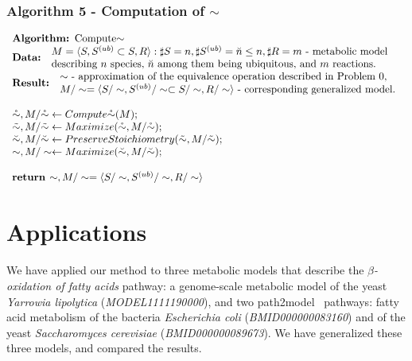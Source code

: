\documentclass[9pt]{article}
\begin{document}
\subsubsection*{Algorithm 5 - Computation of ${\sim}$}
\[ \begin{array}{l}
\mbox{\textbf{Algorithm: }Compute${\sim}$}\\
\mbox{\textbf{Data: }}\begin{array}{l}\mbox{$M=\langle{S, S^{(ub)}\subset{S}, R}\rangle: \sharp S = n, \sharp S^{(ub)}=\breve{n} \leq n, \sharp R = m$ - metabolic model}\\ \mbox{describing $n$ species,  $\breve{n}$ among them being ubiquitous,  and $m$ reactions.}\end{array}\\
\mbox{\textbf{Result: }}\begin{array}{l}\mbox{$\sim$ - approximation of the equivalence operation described in Problem~0,}\\ \mbox{$M/\sim = \langle S/\sim, S^{(ub)}/\sim \subset S/\sim, R/\sim \rangle$ - corresponding generalized model.}\end{array}\\
\mbox{~}\\
\mbox{$\mathring{\sim}, M/\mathring{\sim} \leftarrow Compute\mathring{\sim}(M);$} \\
\mbox{$\tilde{\sim}, M/\tilde{\sim} \leftarrow Maximize(\mathring{\sim}, M/{\mathring{\sim}});$} \\
\mbox{$\breve{\sim}, M/\breve{\sim} \leftarrow PreserveStoichiometry(\tilde{\sim}, M/\tilde{\sim});$} \\
\mbox{$\sim, M/\sim \leftarrow Maximize(\breve{\sim}, M/\breve{\sim});$} \\
\mbox{~}\\
\mbox{\textbf{return }$\sim, M/\sim = \langle S/\sim, S^{(ub)}/\sim, R/\sim \rangle$}
\end{array} \]

\newpage
\section*{Applications}
We have applied our method to three metabolic models that describe the \textit{$\beta$-oxidation of fatty acids} pathway: a genome-scale metabolic model of the yeast \textit{Yarrowia lipolytica} (\emph{MODEL1111190000}), and two path2model~\citep{Li10} pathways: fatty acid metabolism of the bacteria \textit{Escherichia coli} (\emph{BMID000000083160}) and of the yeast \textit{Saccharomyces cerevisiae} (\emph{BMID000000089673}). We have generalized these three models, and compared the results. 
\end{document}
